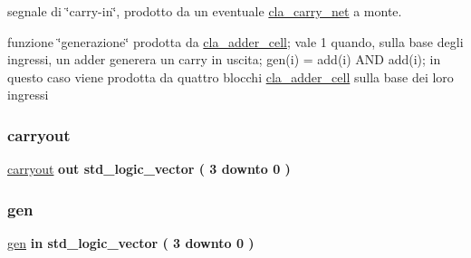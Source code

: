 segnale di \char`\"{}carry-\/in\char`\"{}, prodotto da un eventuale \hyperlink{classcla__carry__net}{cla\+\_\+carry\+\_\+net} a monte. 

funzione \char`\"{}generazione\char`\"{} prodotta da \hyperlink{classcla__adder__cell}{cla\+\_\+adder\+\_\+cell}; vale 1 quando, sulla base degli ingressi, un adder generera\textquotesingle{} un carry in uscita; gen(i) = add(i) A\+ND add(i); in questo caso viene prodotta da quattro blocchi \hyperlink{classcla__adder__cell}{cla\+\_\+adder\+\_\+cell} sulla base dei loro ingressi \mbox{\label{group___carry_network_ga6b265f3fe41195485dfedd9824c3598f}} 
\subsubsection{\texorpdfstring{carryout}{carryout}}
{\footnotesize\ttfamily \hyperlink{group___carry_network_ga6b265f3fe41195485dfedd9824c3598f}{carryout} {\bfseries \textcolor{vhdlchar}{out}\textcolor{vhdlchar}{ }} {\bfseries \textcolor{vhdlchar}{std\+\_\+logic\+\_\+vector}\textcolor{vhdlchar}{ }\textcolor{vhdlchar}{(}\textcolor{vhdlchar}{ }\textcolor{vhdlchar}{ } \textcolor{vhdldigit}{3} \textcolor{vhdlchar}{ }\textcolor{vhdlchar}{downto}\textcolor{vhdlchar}{ }\textcolor{vhdlchar}{ } \textcolor{vhdldigit}{0} \textcolor{vhdlchar}{ }\textcolor{vhdlchar}{)}\textcolor{vhdlchar}{ }} \hspace{0.3cm}{\ttfamily [Port]}}

\mbox{\label{group___carry_network_ga1ff97daaf4e03defc21748593cacfaa7}} 
\subsubsection{\texorpdfstring{gen}{gen}}
{\footnotesize\ttfamily \hyperlink{group___carry_network_ga1ff97daaf4e03defc21748593cacfaa7}{gen} {\bfseries \textcolor{vhdlchar}{in}\textcolor{vhdlchar}{ }} {\bfseries \textcolor{vhdlchar}{std\+\_\+logic\+\_\+vector}\textcolor{vhdlchar}{ }\textcolor{vhdlchar}{(}\textcolor{vhdlchar}{ }\textcolor{vhdlchar}{ } \textcolor{vhdldigit}{3} \textcolor{vhdlchar}{ }\textcolor{vhdlchar}{downto}\textcolor{vhdlchar}{ }\textcolor{vhdlchar}{ } \textcolor{vhdldigit}{0} \textcolor{vhdlchar}{ }\textcolor{vhdlchar}{)}\textcolor{vhdlchar}{ }} \hspace{0.3cm}{\ttfamily [Port]}}

